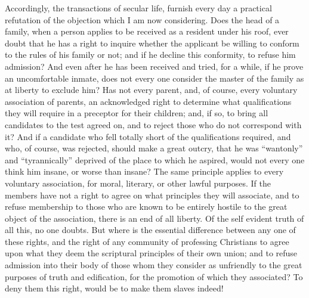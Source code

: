 \documentclass[
]{book}
\begin{document}
Accordingly, the transactions of secular life, furnish every day a practical refutation of the objection which I am now considering. Does the head of a family, when a person applies to be received as a resident under his roof, ever doubt that he has a right to inquire whether the applicant be willing to conform to the rules of his family or not; and if he decline this conformity, to refuse him admission? And even after he has been received and tried, for a while, if he prove an uncomfortable inmate, does not every one consider the master of the family as at liberty to exclude him? Has not every parent, and, of course, every voluntary association of parents, an acknowledged right to determine what qualifications they will require in a preceptor for their children; and, if so, to bring all candidates to the test agreed on, and to reject those who do not correspond with it? And if a candidate who fell totally short of the qualifications required, and who, of course, was rejected, should make a great outcry, that he was ``wantonly'' and ``tyrannically'' deprived of the place to which he aspired, would not every one think him insane, or worse than insane? The same principle applies to every voluntary association, for moral, literary, or other lawful purposes. If the members have not a right to agree on what principles they will associate, and to refuse membership to those who are known to be entirely hostile to the great object of the association, there is an end of all liberty. Of the self evident truth of all this, no one doubts. But where is the essential difference between any one of these rights, and the right of any community of professing Christians to agree upon what they deem the scriptural principles of their own union; and to refuse admission into their body of those whom they consider as unfriendly to the great purposes of truth and edification, for the promotion of which they associated? To deny them this right, would be to make them slaves indeed!
\end{document}
